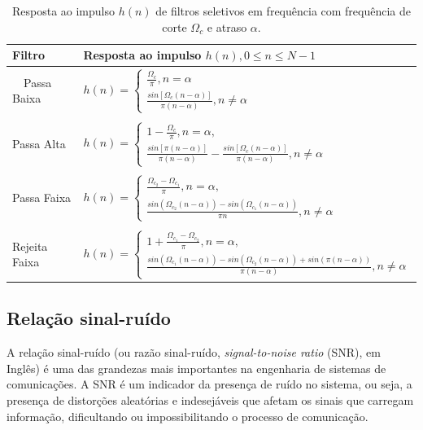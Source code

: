 \documentclass[12pt,addpoints]{exam}
\begin{document}
\begin{table}[t]
\begin{center}
\begin{tabular}{ll}  \\ \hline
Filtro &  Resposta ao impulso $h(n), 0\leq n \leq N-1$  \\ \hline
\ \
Passa Baixa
& 
$h(n)=\begin{cases}
\frac{\Omega_c}{\pi}, n=\alpha \\
\frac{sin\left[\Omega_c \left(n-\alpha\right)\right]}{\pi \left(n-\alpha\right)} , n\neq \alpha 
\end{cases}$ \\
\\
Passa Alta  
& 
$h(n)=\begin{cases}
1-\frac{\Omega_c}{\pi}, n=\alpha, \\
\frac{sin\left[\pi \left(n-\alpha\right)\right]}{\pi \left(n-\alpha\right)} - \frac{sin\left[\Omega_c \left(n-\alpha\right)\right]}{\pi \left(n-\alpha\right)} , n\neq \alpha 
\end{cases}$ \\
\\
Passa Faixa 
& 
$h(n)=\begin{cases}
\frac{\Omega_{c_2}-\Omega_{c_1}}{\pi}, n=\alpha, \\
\frac{sin(\Omega_{c_2} \left(n-\alpha\right))-sin(\Omega_{c_1} \left(n-\alpha\right))}{\pi n} , n\neq \alpha 
\end{cases}$ \\
\\
Rejeita Faixa  
& 
$h(n)=\begin{cases}
1+\frac{ \Omega_{c_1}-\Omega_{c_2}}{\pi}, n=\alpha, \\
\frac{sin(\Omega_{c_1} \left(n-\alpha\right))-sin(\Omega_{c_2} \left(n-\alpha\right)) + sin(\pi\left(n-\alpha\right))}{\pi \left(n-\alpha\right)} , n\neq \alpha
\end{cases}$ \\

\end{tabular}
\end{center}
\caption{Resposta ao impulso $h(n)$ de filtros seletivos em frequência com frequência de corte $\Omega_c$ e atraso $\alpha$.}
\label{tab:filtrosReais}
\end{table}



\subsection{Relação sinal-ruído} \label{sec:theorySNR}
A relação sinal-ruído (ou razão sinal-ruído, \textit{signal-to-noise ratio} (SNR), em Inglês) é uma das grandezas mais importantes na engenharia de sistemas de comunicações. A SNR é um indicador da presença de ruído no sistema, ou seja, a presença de distorções aleatórias e indesejáveis que afetam os sinais que carregam informação, dificultando ou impossibilitando o processo de comunicação. 
\end{document}
